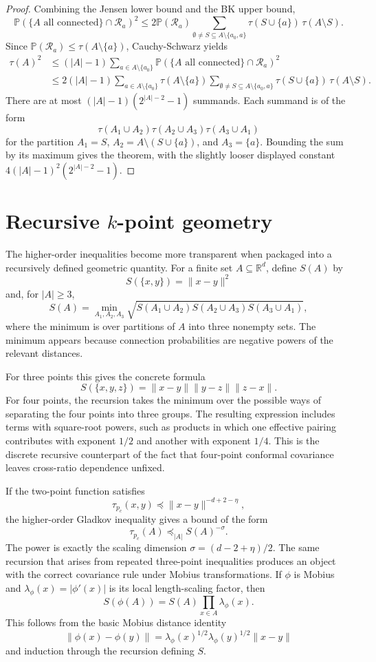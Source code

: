\documentclass[11pt,reqno]{book}
\numberwithin{equation}{chapter}
\theoremstyle{plain}
\theoremstyle{definition}
\theoremstyle{remark}
\renewcommand{\P}{\mathbb P}
\newcommand{\R}{\mathbb R}
\newcommand{\1}{\mathbf 1}
\newcommand{\norm}[1]{\lVert #1\rVert}
\newcommand{\pre}{\preceq}
\begin{document}
\begin{proof}
Combining the Jensen lower bound and the BK upper bound,
\[
  \P(\{A\text{ all connected}\}\cap\mathscr R_a)^2
  \leq
  2\P(\mathscr R_a)
  \sum_{\emptyset\ne S\subseteq A\setminus\{a_0,a\}}
  \tau(S\cup\{a\})\,\tau(A\setminus S).
\]
Since \(\P(\mathscr R_a)\leq\tau(A\setminus\{a\})\), Cauchy-Schwarz yields
\[
\begin{aligned}
  \tau(A)^2
  &\leq
  (|A|-1)
  \sum_{a\in A\setminus\{a_0\}}
  \P(\{A\text{ all connected}\}\cap\mathscr R_a)^2
  \\
  &\leq
  2(|A|-1)
  \sum_{a\in A\setminus\{a_0\}}
  \tau(A\setminus\{a\})
  \sum_{\emptyset\ne S\subseteq A\setminus\{a_0,a\}}
  \tau(S\cup\{a\})\,\tau(A\setminus S).
\end{aligned}
\]
There are at most \((|A|-1)(2^{|A|-2}-1)\) summands. Each summand is of the
form
\[
  \tau(A_1\cup A_2)\tau(A_2\cup A_3)\tau(A_3\cup A_1)
\]
for the partition \(A_1=S\), \(A_2=A\setminus(S\cup\{a\})\), and
\(A_3=\{a\}\). Bounding the sum by its maximum gives the theorem, with the
slightly looser displayed constant \(4(|A|-1)^2(2^{|A|-2}-1)\).
\end{proof}

\section[Recursive k-point geometry]{Recursive \(k\)-point geometry}

The higher-order inequalities become more transparent when packaged into a recursively defined geometric quantity. For a finite set $A\subseteq\R^d$, define $S(A)$ by
\[
  S(\{x,y\})=\norm{x-y}^2
\]
and, for $|A|\geq 3$,
\[
  S(A)=
  \min_{A_1,A_2,A_3}
  \sqrt{
    S(A_1\cup A_2)
    S(A_2\cup A_3)
    S(A_3\cup A_1)
  },
\]
where the minimum is over partitions of $A$ into three nonempty sets. The minimum appears because connection probabilities are negative powers of the relevant distances.

For three points this gives the concrete formula
\[
  S(\{x,y,z\})=\norm{x-y}\norm{y-z}\norm{z-x}.
\]
For four points, the recursion takes the minimum over the possible ways of separating the four points into three groups. The resulting expression includes terms with square-root powers, such as products in which one effective pairing contributes with exponent $1/2$ and another with exponent $1/4$. This is the discrete recursive counterpart of the fact that four-point conformal covariance leaves cross-ratio dependence unfixed.

If the two-point function satisfies
\[
  \tau_{p_c}(x,y)\pre \norm{x-y}^{-d+2-\eta},
\]
the higher-order Gladkov inequality gives a bound of the form
\[
  \tau_{p_c}(A)
  \pre_{|A|}
  S(A)^{-\sigma}.
\]
The power is exactly the scaling dimension $\sigma=(d-2+\eta)/2$. The same recursion that arises from repeated three-point inequalities produces an object with the correct covariance rule under Mobius transformations. If $\phi$ is Mobius and $\lambda_\phi(x)=|\phi'(x)|$ is its local length-scaling factor, then
\[
  S(\phi(A))
  =
  S(A)\prod_{x\in A}\lambda_\phi(x).
\]
This follows from the basic Mobius distance identity
\[
  \norm{\phi(x)-\phi(y)}
  =
  \lambda_\phi(x)^{1/2}\lambda_\phi(y)^{1/2}\norm{x-y}
\]
and induction through the recursion defining $S$.
\end{document}
